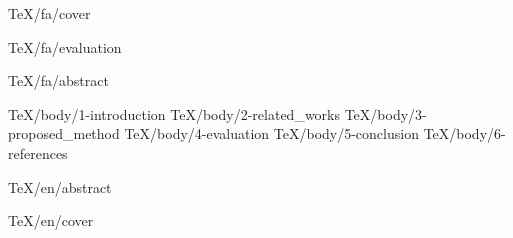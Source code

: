 \documentclass [
	a4paper, %
	12pt, %
	oneside %
] {report} %
\begin{document}
	
	 {TeX/fa/cover}
	
	
	 {TeX/fa/evaluation}
	
	
	
	 {TeX/fa/abstract}

	\tableofcontents
	
	\begingroup
		\let\clearpage\relax
		\listoffigures
		\listoftables
	\endgroup

	
	 {TeX/body/1-introduction}
	 {TeX/body/2-related_works}
	 {TeX/body/3-proposed_method}
	 {TeX/body/4-evaluation}
	 {TeX/body/5-conclusion}
	 {TeX/body/6-references}
	
	\begin {latin}
		 {TeX/en/abstract}
		
		 {TeX/en/cover}
	\end {latin}
\end{document}
